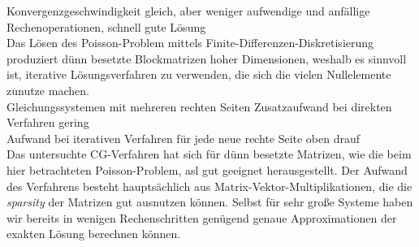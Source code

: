\documentclass{scrartcl}
\begin{document}
Konvergenzgeschwindigkeit gleich, aber weniger aufwendige und anfällige Rechenoperationen, schnell gute Lösung\\

Das Lösen des Poisson-Problem mittels Finite-Differenzen-Diskretisierung produziert dünn besetzte Blockmatrizen hoher Dimensionen, weshalb es sinnvoll ist, iterative Lösungsverfahren zu verwenden, die sich die vielen Nullelemente zunutze machen.\\

Gleichungssystemen mit mehreren rechten Seiten Zusatzaufwand bei direkten Verfahren gering \\
Aufwand bei iterativen Verfahren für jede neue rechte Seite oben drauf \\

Das untersuchte CG-Verfahren hat sich für dünn besetzte Matrizen, wie die beim hier betrachteten Poisson-Problem, asl gut geeignet herausgestellt.
Der Aufwand des Verfahrens besteht hauptsächlich aus Matrix-Vektor-Multiplikationen, die die \textit{sparsity} der Matrizen gut ausnutzen können.
Selbst für sehr große Systeme haben wir bereits in wenigen Rechenschritten genügend genaue Approximationen der exakten Lösung berechnen können. 


\pagebreak


\end{document}
